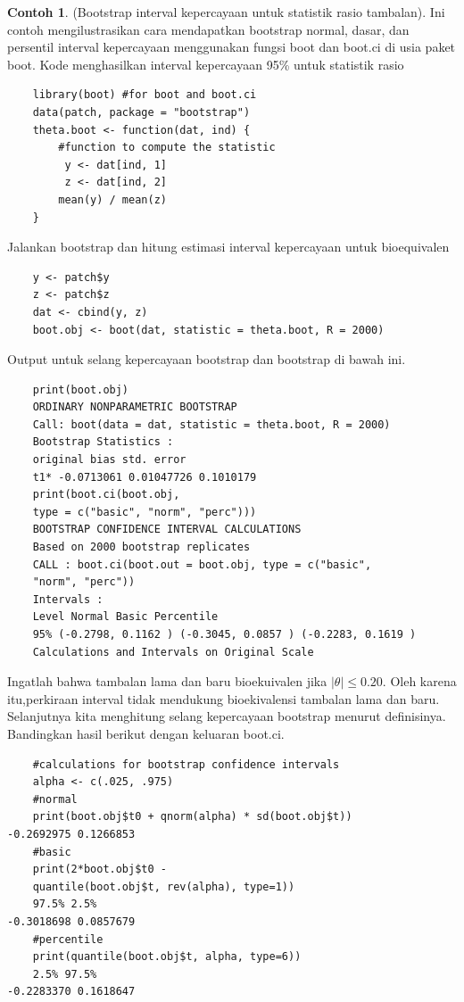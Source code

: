 \documentclass[a4paper,12pt]{article}
\theoremstyle{definition}
\newtheorem{example}{Contoh}[section]
\begin{document}
\begin{example} (Bootstrap interval kepercayaan untuk statistik rasio tambalan).
Ini contoh mengilustrasikan cara mendapatkan bootstrap normal, dasar, dan persentil interval kepercayaan menggunakan fungsi boot dan boot.ci di usia paket boot. Kode menghasilkan interval kepercayaan 95\% untuk statistik rasio
\begin{lstlisting}
    library(boot) #for boot and boot.ci
    data(patch, package = "bootstrap")
    theta.boot <- function(dat, ind) {
        #function to compute the statistic
         y <- dat[ind, 1]
         z <- dat[ind, 2]
        mean(y) / mean(z)
    }
\end{lstlisting}   
Jalankan bootstrap dan hitung estimasi interval kepercayaan untuk bioequivalen
\begin{lstlisting}
    y <- patch$y
    z <- patch$z
    dat <- cbind(y, z)
    boot.obj <- boot(dat, statistic = theta.boot, R = 2000)
\end{lstlisting}
Output untuk selang kepercayaan bootstrap dan bootstrap di bawah ini.
\begin{lstlisting}
    print(boot.obj)
    ORDINARY NONPARAMETRIC BOOTSTRAP
    Call: boot(data = dat, statistic = theta.boot, R = 2000)
    Bootstrap Statistics :
    original bias std. error
    t1* -0.0713061 0.01047726 0.1010179
    print(boot.ci(boot.obj,
    type = c("basic", "norm", "perc")))
    BOOTSTRAP CONFIDENCE INTERVAL CALCULATIONS
    Based on 2000 bootstrap replicates
    CALL : boot.ci(boot.out = boot.obj, type = c("basic",
    "norm", "perc"))
    Intervals :
    Level Normal Basic Percentile
    95% (-0.2798, 0.1162 ) (-0.3045, 0.0857 ) (-0.2283, 0.1619 )
    Calculations and Intervals on Original Scale
\end{lstlisting}
Ingatlah bahwa tambalan lama dan baru bioekuivalen jika $\left | \theta  \right |\leq 0.20$. Oleh karena itu,perkiraan interval tidak mendukung bioekivalensi tambalan lama dan baru.
Selanjutnya kita menghitung selang kepercayaan bootstrap menurut definisinya. Bandingkan hasil berikut dengan keluaran boot.ci.
\begin{lstlisting}
    #calculations for bootstrap confidence intervals
    alpha <- c(.025, .975)
    #normal
    print(boot.obj$t0 + qnorm(alpha) * sd(boot.obj$t))
-0.2692975 0.1266853
    #basic
    print(2*boot.obj$t0 -
    quantile(boot.obj$t, rev(alpha), type=1))
    97.5% 2.5%
-0.3018698 0.0857679
    #percentile
    print(quantile(boot.obj$t, alpha, type=6))
    2.5% 97.5%
-0.2283370 0.1618647
\end{lstlisting}

\end{example}
\end{document}
